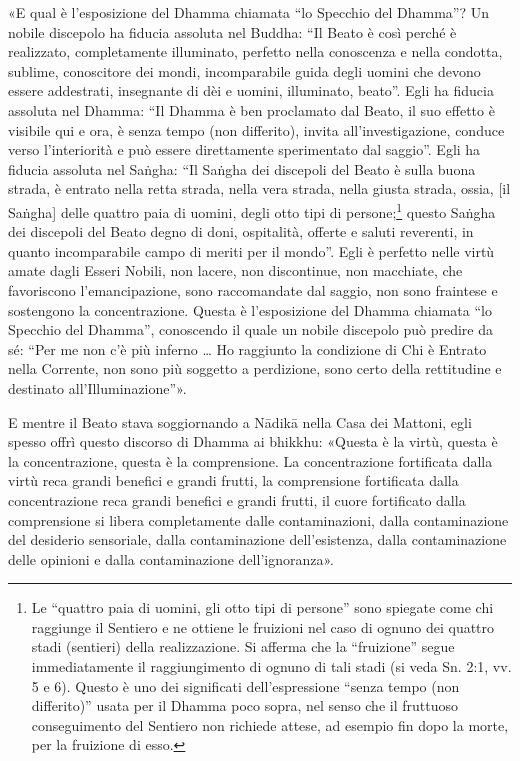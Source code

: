 «E qual è l’esposizione del Dhamma chiamata “lo Specchio del Dhamma”? Un nobile
discepolo ha fiducia assoluta nel Buddha: “Il Beato è così perché è realizzato,
completamente illuminato, perfetto nella conoscenza e nella condotta, sublime,
conoscitore dei mondi, incomparabile guida degli uomini che devono essere
addestrati, insegnante di dèi e uomini, illuminato, beato”. Egli ha fiducia
assoluta nel Dhamma: “Il Dhamma è ben proclamato dal Beato, il suo effetto è
visibile qui e ora, è senza tempo (non differito), invita all’investigazione,
conduce verso l’interiorità e può essere direttamente sperimentato dal saggio”.
Egli ha fiducia assoluta nel Saṅgha: “Il Saṅgha dei discepoli del Beato è sulla
buona strada, è entrato nella retta strada, nella vera strada, nella giusta
strada, ossia, [il Saṅgha] delle quattro paia di uomini, degli otto tipi di
persone;\footnote{Le “quattro paia di uomini, gli otto tipi di persone” sono
  spiegate come chi raggiunge il Sentiero e ne ottiene le fruizioni nel caso di
  ognuno dei quattro stadi (sentieri) della realizzazione. Si afferma che la
  “fruizione” segue immediatamente il raggiungimento di ognuno di tali stadi (si
  veda Sn. 2:1, vv. 5 e 6). Questo è uno dei significati dell’espressione “senza
  tempo (non differito)” usata per il Dhamma poco sopra, nel senso che il
  fruttuoso conseguimento del Sentiero non richiede attese, ad esempio fin dopo
  la morte, per la fruizione di esso.} questo Saṅgha dei discepoli del Beato
degno di doni, ospitalità, offerte e saluti reverenti, in quanto incomparabile
campo di meriti per il mondo”. Egli è perfetto nelle virtù amate dagli Esseri
Nobili, non lacere, non discontinue, non macchiate, che favoriscono
l’emancipazione, sono raccomandate dal saggio, non sono fraintese e sostengono
la concentrazione. Questa è l’esposizione del Dhamma chiamata “lo Specchio del
Dhamma”, conoscendo il quale un nobile discepolo può predire da sé: “Per me non
c’è più inferno … Ho raggiunto la condizione di Chi è Entrato nella Corrente,
non sono più soggetto a perdizione, sono certo della rettitudine e destinato
all’Illuminazione”».

E mentre il Beato stava soggiornando a Nādikā nella Casa dei Mattoni, egli
spesso offrì questo discorso di Dhamma ai bhikkhu: «Questa è la virtù, questa è
la concentrazione, questa è la comprensione. La concentrazione fortificata dalla
virtù reca grandi benefici e grandi frutti, la comprensione fortificata dalla
concentrazione reca grandi benefici e grandi frutti, il cuore fortificato dalla
comprensione si libera completamente dalle contaminazioni, dalla contaminazione
del desiderio sensoriale, dalla contaminazione dell’esistenza, dalla
contaminazione delle opinioni e dalla contaminazione dell’ignoranza».

